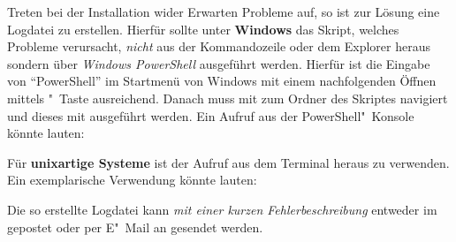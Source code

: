 Treten bei der Installation wider Erwarten Probleme auf, so ist zur Lösung eine 
Logdatei zu erstellen. Hierfür sollte unter \textbf{Windows} das Skript, 
welches Probleme verursacht, \emph{nicht} aus der Kommandozeile oder dem 
Explorer heraus sondern über \emph{Windows PowerShell} ausgeführt werden. 
Hierfür ist die Eingabe von \enquote{PowerShell} im Startmenü von Windows mit 
einem nachfolgenden Öffnen mittels "~Taste ausreichend. 
Danach muss mit  zum Ordner des Skriptes navigiert und dieses mit 
ausgeführt werden. Ein Aufruf aus der PowerShell"~Konsole könnte lauten:
%
\begin{quoting}[rightmargin=0pt]
  \newline%
\end{quoting}
%
Für \textbf{unixartige Systeme} ist der Aufruf 
 aus dem Terminal heraus zu 
verwenden. Ein exemplarische Verwendung könnte lauten:
%
\begin{quoting}
  \newline
\end{quoting}
%
Die so erstellte Logdatei kann \emph{mit einer kurzen Fehlerbeschreibung} 
entweder im \Forum* gepostet oder per E"~Mail an \mailto{\TUDScriptContact}
gesendet werden.
%
